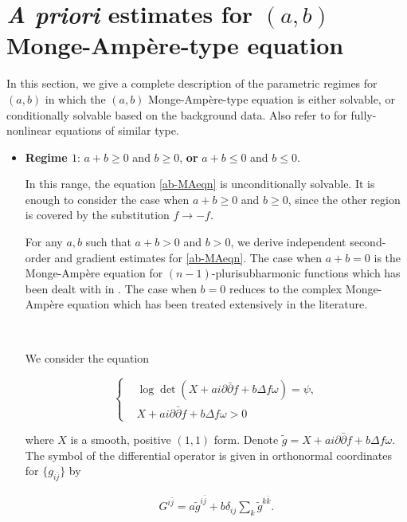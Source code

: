 \documentclass[11pt,letterpaper]{amsart}
\newcommand{\bj}{\bar{j}}
\newcommand{\bk}{\bar{k}}
\newcommand{\pbp}{\partial \bar{\partial}}
\numberwithin{equation}{section}
\begin{document}
\section{\emph{ A priori} estimates for $(a,b)$ Monge-Amp\`ere-type equation}

\bigskip


In this section, we give a complete description of the parametric regimes for $(a,b)$ in which the $(a,b)$ Monge-Amp\`ere-type equation is either solvable, or conditionally solvable based on the background data. Also refer to \cite{GQY19,STW17,TW17} for fully-nonlinear equations of similar type. 

\begin{itemize}
    \item {\bf Regime $1$}: $a+b\geq 0$ and $b \geq 0$, \textbf{or}  $a+b \leq 0$ and $b \leq 0$.

In this range, the equation \eqref{ab-MAeqn} is unconditionally solvable. It is enough to consider the case when $a+b\geq 0$ and $b \geq 0$, since the other region is covered by the substitution $f \to -f$.


For any $a,b$ such that $a+b >0$ and $b > 0$, we derive independent second-order and gradient estimates for \eqref{ab-MAeqn}. The case when $a+b=0$ is the Monge-Amp\`ere equation for $(n-1)$-plurisubharmonic functions which has been dealt with in \cite{George25, TW17}. The case when $b = 0$ reduces to the complex Monge-Amp\`ere equation which has been treated extensively in the literature. 

\

We consider the equation


\begin{equation}\label{abMA-eqn+}
    \begin{cases}
        &\log \det( X + a i \pbp f + b \Delta f \omega) = \psi,\\
        &X + a i \pbp f + b \Delta f \omega >0
    \end{cases}
\end{equation}





\noindent where $X$ is a smooth, positive $(1,1)$ form. Denote $\tilde g =  X + a i \pbp f + b \Delta f \omega $. The symbol of the differential operator is given in orthonormal coordinates for $\{g_{i \bj}\}$ by 

\begin{equation}\label{elliptic+}
    \begin{aligned}
        G^{i \bj} = a\tilde{g}^{i \bj} + b \delta_{i j} \sum_k \tilde g^{k \bk}.
    \end{aligned}
\end{equation}


\end{itemize}
\end{document}
